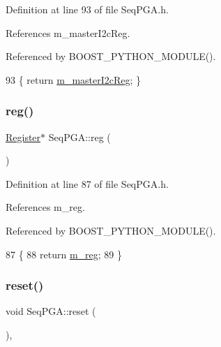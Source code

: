 Definition at line 93 of file Seq\+P\+G\+A.\+h.



References m\+\_\+master\+I2c\+Reg.



Referenced by B\+O\+O\+S\+T\+\_\+\+P\+Y\+T\+H\+O\+N\+\_\+\+M\+O\+D\+U\+L\+E().


\begin{DoxyCode}
93 \{ \textcolor{keywordflow}{return} \hyperlink{classSeqPGA_a942c71b33a4f43b7a994cb9216abb17e}{m\_masterI2cReg}; \}
\end{DoxyCode}
\mbox{\label{classSeqPGA_a43c48f29313ca63046cc8efc6cc73e23}} 
\subsubsection{\texorpdfstring{reg()}{reg()}}
{\footnotesize\ttfamily \hyperlink{classRegister}{Register}$\ast$ Seq\+P\+G\+A\+::reg (\begin{DoxyParamCaption}{ }\end{DoxyParamCaption})\hspace{0.3cm}{\ttfamily [inline]}}



Definition at line 87 of file Seq\+P\+G\+A.\+h.



References m\+\_\+reg.



Referenced by B\+O\+O\+S\+T\+\_\+\+P\+Y\+T\+H\+O\+N\+\_\+\+M\+O\+D\+U\+L\+E().


\begin{DoxyCode}
87                  \{
88     \textcolor{keywordflow}{return} \hyperlink{classSeqPGA_afd827f1d3d55b0a8efafbd79a8c54a52}{m\_reg};
89   \}
\end{DoxyCode}
\mbox{\label{classSeqPGA_aaadcbdd7ad7c96d2d69549b820da6809}} 
\subsubsection{\texorpdfstring{reset()}{reset()}}
{\footnotesize\ttfamily void Seq\+P\+G\+A\+::reset (\begin{DoxyParamCaption}{ }\end{DoxyParamCaption})\hspace{0.3cm}{\ttfamily [inline]}, {\ttfamily [virtual]}}

